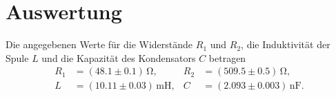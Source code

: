 \section{Auswertung}
Die angegebenen Werte für die Widerstände $R_1$ und $R_2$, die Induktivität der Spule $L$ und die Kapazität des Kondensators $C$ betragen
\begin{align*}
    R_1 &= (\num[]{48.1} \pm \num[]{0.1}) \, \unit{\ohm}, & R_2 &= (\num[]{509.5} \pm \num[]{0.5}) \, \unit{\ohm}, \\
    L &= (\num[]{10.11} \pm \num[]{0.03}) \, \unit{\milli \henry}, & C &= (\num[]{2.093} \pm \num[]{0.003}) \, \unit{\nano \farad}.
\end{align*}

